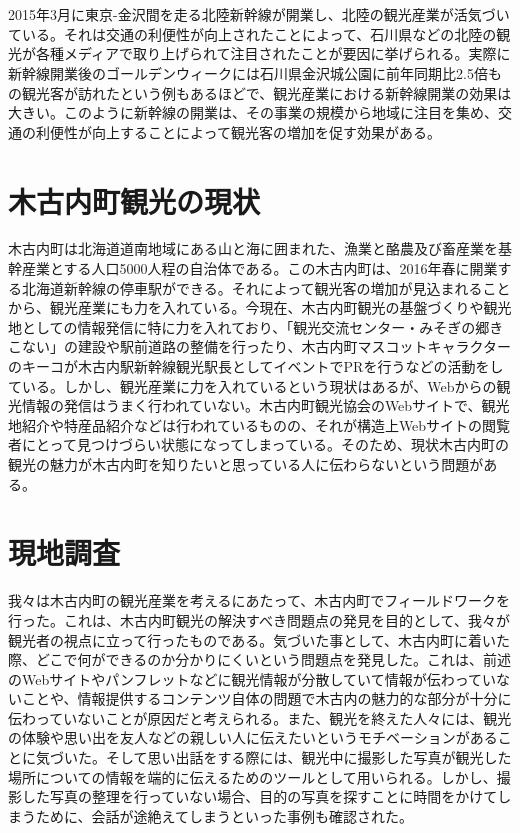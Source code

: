 \section{}
2015年3月に東京-金沢間を走る北陸新幹線が開業し、北陸の観光産業が活気づいている。それは交通の利便性が向上されたことによって、石川県などの北陸の観光が各種メディアで取り上げられて注目されたことが要因に挙げられる。実際に新幹線開業後のゴールデンウィークには石川県金沢城公園に前年同期比2.5倍もの観光客が訪れたという例もあるほどで、観光産業における新幹線開業の効果は大きい。このように新幹線の開業は、その事業の規模から地域に注目を集め、交通の利便性が向上することによって観光客の増加を促す効果がある。

\section{木古内町観光の現状}
木古内町は北海道道南地域にある山と海に囲まれた、漁業と酪農及び畜産業を基幹産業とする人口5000人程の自治体である。この木古内町は、2016年春に開業する北海道新幹線の停車駅ができる。それによって観光客の増加が見込まれることから、観光産業にも力を入れている。今現在、木古内町観光の基盤づくりや観光地としての情報発信に特に力を入れており、「観光交流センター・みそぎの郷きこない」の建設や駅前道路の整備を行ったり、木古内町マスコットキャラクターのキーコが木古内駅新幹線観光駅長としてイベントでPRを行うなどの活動をしている。しかし、観光産業に力を入れているという現状はあるが、Webからの観光情報の発信はうまく行われていない。木古内町観光協会のWebサイトで、観光地紹介や特産品紹介などは行われているものの、それが構造上Webサイトの閲覧者にとって見つけづらい状態になってしまっている。そのため、現状木古内町の観光の魅力が木古内町を知りたいと思っている人に伝わらないという問題がある。

\section{現地調査}\label{sec:gaiyou}
我々は木古内町の観光産業を考えるにあたって、木古内町でフィールドワークを行った。これは、木古内町観光の解決すべき問題点の発見を目的として、我々が観光者の視点に立って行ったものである。気づいた事として、木古内町に着いた際、どこで何ができるのか分かりにくいという問題点を発見した。これは、前述のWebサイトやパンフレットなどに観光情報が分散していて情報が伝わっていないことや、情報提供するコンテンツ自体の問題で木古内の魅力的な部分が十分に伝わっていないことが原因だと考えられる。また、観光を終えた人々には、観光の体験や思い出を友人などの親しい人に伝えたいというモチベーションがあることに気づいた。そして思い出話をする際には、観光中に撮影した写真が観光した場所についての情報を端的に伝えるためのツールとして用いられる。しかし、撮影した写真の整理を行っていない場合、目的の写真を探すことに時間をかけてしまうために、会話が途絶えてしまうといった事例も確認された。


